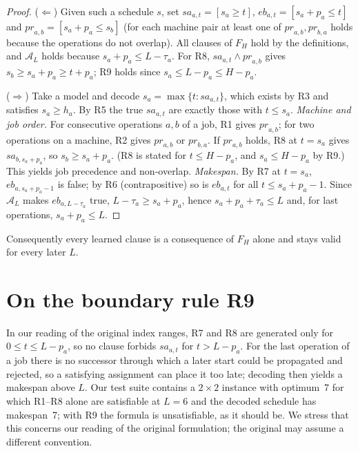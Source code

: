\documentclass[a4paper,fleqn]{cas-sc}
\newcommand{\pr}{\mathit{pr}}
\newcommand{\sa}{\mathit{sa}}
\newcommand{\eb}{\mathit{eb}}
\begin{document}
\begin{proof}
($\Leftarrow$) Given such a schedule $s$, set $\sa_{a,t}=[s_a\ge t]$, $\eb_{a,t}=[s_a+p_a\le t]$ and $\pr_{a,b}=[s_a+p_a\le s_b]$ (for each machine pair at least one of $\pr_{a,b},\pr_{b,a}$ holds because the operations do not overlap).
All clauses of $F_H$ hold by the definitions, and $\mathcal A_L$ holds because $s_a+p_a\le L-\tau_a$.
For R8, $\sa_{a,t}\wedge\pr_{a,b}$ gives $s_b\ge s_a+p_a\ge t+p_a$; R9 holds since $s_a\le L-p_a\le H-p_a$.

($\Rightarrow$) Take a model and decode $s_a=\max\{t:\sa_{a,t}\}$, which exists by R3 and satisfies $s_a\ge h_a$.
By R5 the true $\sa_{a,t}$ are exactly those with $t\le s_a$.
\emph{Machine and job order.} For consecutive operations $a,b$ of a job, R1 gives $\pr_{a,b}$; for two operations on a machine, R2 gives $\pr_{a,b}$ or $\pr_{b,a}$.
If $\pr_{a,b}$ holds, R8 at $t=s_a$ gives $\sa_{b,s_a+p_a}$, so $s_b\ge s_a+p_a$.
(R8 is stated for $t\le H-p_a$, and $s_a\le H-p_a$ by R9.)
This yields job precedence and non-overlap.
\emph{Makespan.} By R7 at $t=s_a$, $\eb_{a,s_a+p_a-1}$ is false; by R6 (contrapositive) so is $\eb_{a,t}$ for all $t\le s_a+p_a-1$.
Since $\mathcal A_L$ makes $\eb_{a,L-\tau_a}$ true, $L-\tau_a\ge s_a+p_a$, hence $s_a+p_a+\tau_a\le L$ and, for last operations, $s_a+p_a\le L$.
\end{proof}

Consequently every learned clause is a consequence of $F_H$ alone and stays valid for every later $L$.

\section{On the boundary rule R9}\label{app:b}
In our reading of the original index ranges, R7 and R8 are generated only for $0\le t\le L-p_a$, so no clause forbids $\sa_{a,t}$ for $t>L-p_a$.
For the last operation of a job there is no successor through which a later start could be propagated and rejected, so a satisfying assignment can place it too late; decoding then yields a makespan above $L$.
Our test suite contains a $2\times2$ instance with optimum~7 for which R1--R8 alone are satisfiable at $L=6$ and the decoded schedule has makespan~7; with R9 the formula is unsatisfiable, as it should be.
We stress that this concerns our reading of the original formulation; the original may assume a different convention.



\end{document}
